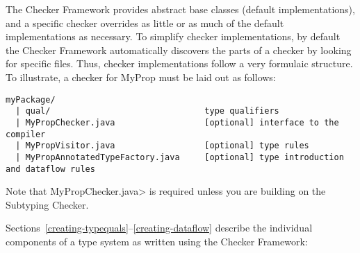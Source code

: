 The Checker Framework provides abstract base classes (default
implementations), and a specific checker overrides as little or as much of
the default implementations as necessary.
To simplify checker implementations, by default the Checker Framework
automatically discovers the parts of a checker by looking for specific files.
Thus, checker implementations follow a very formulaic structure.
To illustrate, a checker for MyProp must be laid out as follows:
%
\begin{Verbatim}
myPackage/
  | qual/                               type qualifiers
  | MyPropChecker.java                  [optional] interface to the compiler
  | MyPropVisitor.java                  [optional] type rules
  | MyPropAnnotatedTypeFactory.java     [optional] type introduction and dataflow rules
\end{Verbatim}
%
Note that \<MyPropChecker.java> is required unless you are building on the
Subtyping Checker.

Sections~\ref{creating-typequals}--\ref{creating-dataflow} describe
the individual components of a type system as written using the Checker
Framework:

